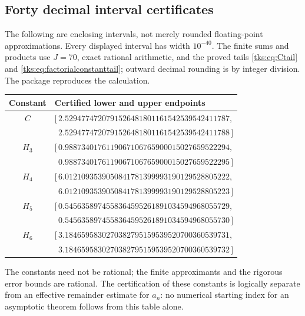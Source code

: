 \subsection{Forty decimal interval certificates}
The following are enclosing intervals, not merely rounded floating-point approximations. Every displayed interval has width $10^{-40}$. The finite sums and products use $J=70$, exact rational arithmetic, and the proved tails \eqref{tks:eq:Ctail} and \eqref{tks:eq:factorialconstanttail}; outward decimal rounding is by integer division. The package reproduces the calculation.
\begin{center}
\small
\begin{tabular}{cl}
\toprule
Constant & Certified lower and upper endpoints\\
\midrule
$C$ & $[\,2.5294774720791526481801161542539542411787,$\\
    & $\phantom{[\,}2.5294774720791526481801161542539542411788\,]$\\[3pt]
$H_3$ & $[\,0.9887340176119067106765900015027659522294,$\\
    & $\phantom{[\,}0.9887340176119067106765900015027659522295\,]$\\[3pt]
$H_4$ & $[\,6.0121093539050841781399993190129528805222,$\\
    & $\phantom{[\,}6.0121093539050841781399993190129528805223\,]$\\[3pt]
$H_5$ & $[\,0.5456358974558364595261891034594968055729,$\\
    & $\phantom{[\,}0.5456358974558364595261891034594968055730\,]$\\[3pt]
$H_6$ & $[\,3.1846595830270382795159539520700360539731,$\\
    & $\phantom{[\,}3.1846595830270382795159539520700360539732\,]$\\
\bottomrule
\end{tabular}
\end{center}
The constants need not be rational; the finite approximants and the rigorous error bounds are rational. The certification of these constants is logically separate from an effective remainder estimate for $a_n$: no numerical starting index for an asymptotic theorem follows from this table alone.

